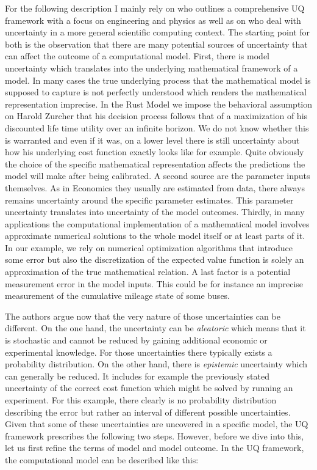 For the following description I mainly rely on \cite{Smith.2013} who outlines a comprehensive UQ framework with a focus on engineering and physics as well as on \cite{Oberkampf.2010} who deal with uncertainty in a more general scientific computing context.  The starting point for both is the observation that there are many potential sources of uncertainty that can affect the outcome of a computational model. First, there is model uncertainty which translates into the underlying mathematical framework of a model. In many cases the true underlying process that the mathematical model is supposed to capture is not perfectly understood which renders the mathematical representation imprecise. In the Rust Model we impose the behavioral assumption on Harold Zurcher that his decision process follows that of a maximization of his discounted life time utility over an infinite horizon. We do not know whether this is warranted and even if it was, on a lower level there is still uncertainty about how his underlying cost function exactly looks like for example. Quite obviously the choice of the specific mathematical representation affects the predictions the model will make after being calibrated. A second source are the parameter inputs themselves. As in Economics they usually are estimated from data, there always remains uncertainty around the specific parameter estimates. This parameter uncertainty translates into uncertainty of the model outcomes. Thirdly, in many applications the computational implementation of a mathematical model involves approximate numerical solutions to the whole model itself or at least parts of it. In our example, we rely on numerical optimization algorithms that introduce some error but also the discretization of the expected value function is solely an approximation of the true mathematical relation. A last factor is a potential measurement error in the model inputs. This could be for instance an imprecise measurement of the cumulative mileage state of some buses.

The authors argue now that the very nature of those uncertainties can be different. On the one hand, the uncertainty can be \textit{aleatoric} which means that it is stochastic and cannot be reduced by gaining additional economic or experimental knowledge. For those uncertainties there typically exists a probability distribution. On the other hand, there is \textit{epistemic} uncertainty which can generally be reduced. It includes for example the previously stated uncertainty of the correct cost function which might be solved by running an experiment. For this example, there clearly is no probability distribution describing the error but rather an interval of different possible uncertainties. Given that some of these uncertainties are uncovered in a specific model, the UQ framework prescribes the following two steps. However, before we dive into this, let us first refine the terms of model and model outcome. In the UQ framework, the computational model can be described like this:

